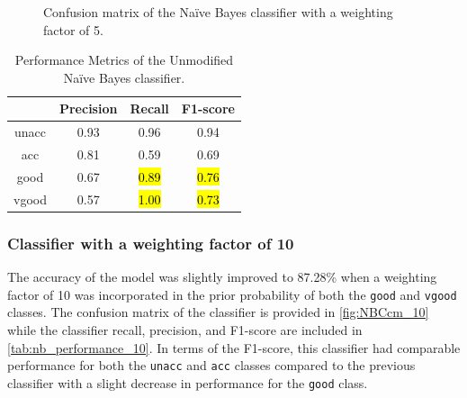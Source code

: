 \documentclass[a4paper]{article}
\begin{document}
\begin{figure} [h!]
  \caption{Confusion matrix of the Naïve Bayes classifier with a weighting factor of 5.} 
  \label{fig:NBCcm_5}
\end{figure}

\begin{table}[h!]
  \centering
  \caption{Performance Metrics of the Unmodified Naïve Bayes classifier.}
  \label{tab:nb_performance_5}
  \begin{tabular}{||cccc||}
  \hline
  \textbf{ }    & \textbf{Precision}    & \textbf{Recall}   & \textbf{F1-score} \\
  \hline \hline
  unacc         & 0.93                  & 0.96              & 0.94\\ \hline
  acc           & 0.81                  & 0.59              & 0.69\\ \hline
  good          & 0.67                  & \hl{0.89}         & \hl{0.76}\\ \hline
  vgood         & 0.57                  & \hl{1.00}         & \hl{0.73}\\
  \hline
  \end{tabular}
\end{table}


\subsubsection{Classifier with a weighting factor of 10}
The accuracy of the model was slightly improved to 87.28\% when a weighting factor of 10 was incorporated in the prior probability of both the \lstinline{good} and \lstinline{vgood} classes. The confusion matrix of the classifier is provided in \autoref{fig:NBCcm_10} while the classifier recall, precision, and F1-score are included in \autoref{tab:nb_performance_10}. In terms of the F1-score, this classifier had comparable performance for both the \lstinline{unacc} and \lstinline{acc} classes compared to the previous classifier with a slight decrease in performance for the \lstinline{good} class.
\end{document}
